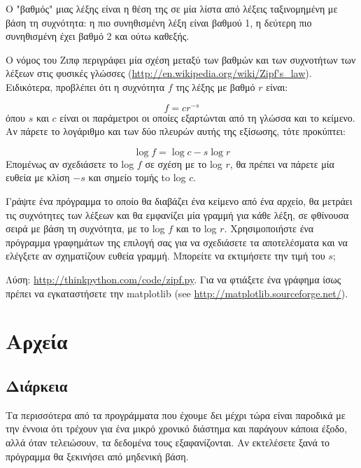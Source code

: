 \documentclass[10pt]{book}
\begin{document}
\begin{exercise}

Ο "βαθμός" μιας λέξης είναι η θέση της σε μία λίστα από λέξεις ταξινομημένη με βάση τη συχνότητα: η πιο συνηθισμένη λέξη είναι βαθμού 1, η δεύτερη πιο συνηθισμένη έχει βαθμό 2 και ούτω καθεξής.

Ο νόμος του Ζιπφ περιγράφει μία σχέση μεταξύ των βαθμών και των συχνοτήτων των λέξεων 
στις φυσικές γλώσσες (\url{http://en.wikipedia.org/wiki/Zipf's_law}). Ειδικότερα, προβλέπει ότι η 
συχνότητα $f$ της λέξης με βαθμό $r$ είναι:

\[ f = c r^{-s} \]
%
όπου $s$ και $c$ είναι οι παράμετροι οι οποίες εξαρτώνται από τη γλώσσα και το κείμενο. Αν πάρετε το λογάριθμο και των δύο πλευρών αυτής της εξίσωσης, τότε προκύπτει:

\[ \log f = \log c - s \log r \]
%
Επομένως αν σχεδιάσετε το log $f$ σε σχέση με το log $r$, θα πρέπει να πάρετε μία ευθεία με κλίση $-s$ και 
σημείο τομής  to log $c$.

Γράψτε ένα πρόγραμμα το οποίο θα διαβάζει ένα κείμενο από ένα αρχείο, θα μετράει τις συχνότητες των λέξεων και θα εμφανίζει μία γραμμή για κάθε λέξη, σε φθίνουσα σειρά με βάση τη συχνότητα, με το log $f$ και το log $r$. Χρησιμοποιήστε ένα πρόγραμμα γραφημάτων της επιλογή σας για να σχεδιάσετε τα αποτελέσματα και να ελέγξετε αν σχηματίζουν ευθεία γραμμή. Μπορείτε να εκτιμήσετε την τιμή του $s$;

Λύση: \url{http://thinkpython.com/code/zipf.py}. Για να φτιάξετε ένα γράφημα ίσως πρέπει να εγκαταστήσετε την  matplotlib (see \url{http://matplotlib.sourceforge.net/}).

\end{exercise}

 

\chapter{Αρχεία}


\section{Διάρκεια}

Τα περισσότερα από τα προγράμματα που έχουμε δει μέχρι τώρα είναι παροδικά με την έννοια 
ότι τρέχουν για ένα μικρό χρονικό διάστημα και παράγουν κάποια έξοδο, αλλά όταν τελειώσουν, τα δεδομένα τους εξαφανίζονται. Αν εκτελέσετε ξανά το πρόγραμμα θα ξεκινήσει από μηδενική βάση.
\end{document}
